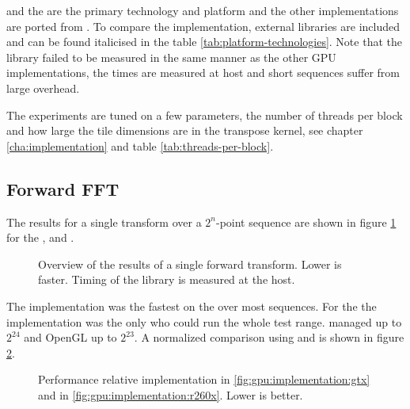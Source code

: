 {\CU} and the {\NVCARD} are the primary technology and platform and the other implementations are ported from {\CU}. To compare the implementation, external libraries are included and can be found italicised in the table \ref{tab:platform-technologies}. Note that the {\CLFFT} library failed to be measured in the same manner as the other GPU implementations, the times are measured at host and short sequences suffer from large overhead.

The experiments are tuned on a few parameters, the number of threads per block and how large the tile dimensions are in the transpose \gls{kernel}, see chapter \ref{cha:implementation} and table \ref{tab:threads-per-block}.

\subsection{Forward FFT}

The results for a single transform over a $2^{n}$-point sequence are shown in figure \ref{fig:gpu:overview} for the {\NVCARD}, {\AMDCARD} and {\INTELCPU}.

\begin{figure}
	\centering
	\subfloat[\NVCARD]{	
		
	}
	\vfill
	\subfloat[\AMDCARD]{
		
	}
	\caption{Overview of the results of a single forward transform. Lower is faster. Timing of the {\CLFFT} library is measured at the host.}
	\label{fig:gpu:overview}
\end{figure}

The {\CU} implementation was the fastest on the {\NVCARD} over most sequences. For the {\AMDCARD} the {\OCL} implementation was the only who could run the whole test range. {\DX} managed up to $2^{24}$ and OpenGL up to $2^{23}$. A normalized comparison using {\CU} and {\OCL} is shown in figure \ref{fig:gpu:implementation}.

\begin{figure}
	\centering
	\subfloat[\NVCARD\label{fig:gpu:implementation:gtx}]{	
		
	}
	\vfill
	\subfloat[\AMDCARD\label{fig:gpu:implementation:r260x}]{
		
	}	
	\caption{Performance relative {\CU} implementation in \ref{fig:gpu:implementation:gtx} and {\OCL} in \ref{fig:gpu:implementation:r260x}. Lower is better.}
	\label{fig:gpu:implementation}
\end{figure}

